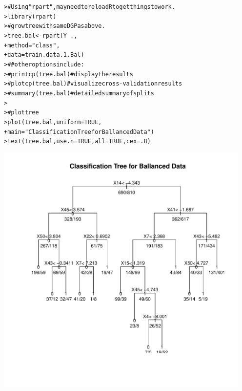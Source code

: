 \documentclass[12pt]{article}\usepackage[]{graphicx}\usepackage[]{color}
\makeatletter
\newcommand{\hlnum}[1]{\textcolor[rgb]{0.82,0.78,0.62}{#1}}%
\newcommand{\hlstr}[1]{\textcolor[rgb]{0.82,0.78,0.62}{#1}}%
\newcommand{\hlcom}[1]{\textcolor[rgb]{0.404,0.408,0.42}{#1}}%
\newcommand{\hlopt}[1]{\textcolor[rgb]{0.882,0.878,0.898}{#1}}%
\newcommand{\hlstd}[1]{\textcolor[rgb]{0.882,0.878,0.898}{#1}}%
\newcommand{\hlkwb}[1]{\textcolor[rgb]{0.902,0.675,0.196}{#1}}%
\newcommand{\hlkwc}[1]{\textcolor[rgb]{0.812,0.522,0.388}{#1}}%
\newcommand{\hlkwd}[1]{\textcolor[rgb]{0.733,0.388,0.812}{#1}}%
\newenvironment{kframe}{%
 \def\at@end@of@kframe{}%
 \ifinner\ifhmode%
  \def\at@end@of@kframe{\end{minipage}}%
  \begin{minipage}{\columnwidth}%
 \fi\fi%
 \def\FrameCommand##1{\hskip\@totalleftmargin \hskip-\fboxsep
 \colorbox{shadecolor}{##1}\hskip-\fboxsep
     \hskip-\linewidth \hskip-\@totalleftmargin \hskip\columnwidth}%
 \MakeFramed {\advance\hsize-\width
   \@totalleftmargin\z@ \linewidth\hsize
   \@setminipage}}%
 {\par\unskip\endMakeFramed%
 \at@end@of@kframe}
\newenvironment{knitrout}{}{} %
\makeatother
\begin{document}
\begin{flushleft}
\begin{knitrout}
\color{fgcolor}\begin{kframe}
\begin{alltt}
\hlstd{> }\hlcom{# Using "rpart", may need to reload R to get things to work.}
\hlstd{> }\hlkwd{library}\hlstd{(rpart)}
\hlstd{> }\hlcom{# grow tree with same DGP as above.}
\hlstd{> }\hlstd{tree.bal} \hlkwb{<-} \hlkwd{rpart}\hlstd{(Y}\hlopt{~}\hlstd{.,}
\hlstd{+ }                  \hlkwc{method} \hlstd{=} \hlstr{"class"}\hlstd{,}
\hlstd{+ }                  \hlkwc{data} \hlstd{= train.data.1.Bal)}
\hlstd{> }\hlcom{## other options include:}
\hlstd{> }\hlcom{# printcp(tree.bal) # display the results}
\hlstd{> }\hlcom{# plotcp(tree.bal)  # visualize cross-validation results}
\hlstd{> }\hlcom{# summary(tree.bal) # detailed summary of splits}
\hlstd{> }
\hlstd{> }\hlcom{# plot tree}
\hlstd{> }\hlkwd{plot}\hlstd{(tree.bal,} \hlkwc{uniform} \hlstd{=} \hlnum{TRUE}\hlstd{,}
\hlstd{+ }     \hlkwc{main} \hlstd{=} \hlstr{"Classification Tree for Ballanced Data"}\hlstd{)}
\hlstd{> }\hlkwd{text}\hlstd{(tree.bal,} \hlkwc{use.n} \hlstd{=} \hlnum{TRUE}\hlstd{,} \hlkwc{all} \hlstd{=} \hlnum{TRUE}\hlstd{,} \hlkwc{cex} \hlstd{=} \hlnum{.8}\hlstd{)}
\end{alltt}
\end{kframe}
\includegraphics[width=5in]{figure/treesML1-1} 
\begin{kframe}\begin{alltt}

\end{alltt}
\end{kframe}
\end{knitrout}
\end{flushleft}
\end{document}
